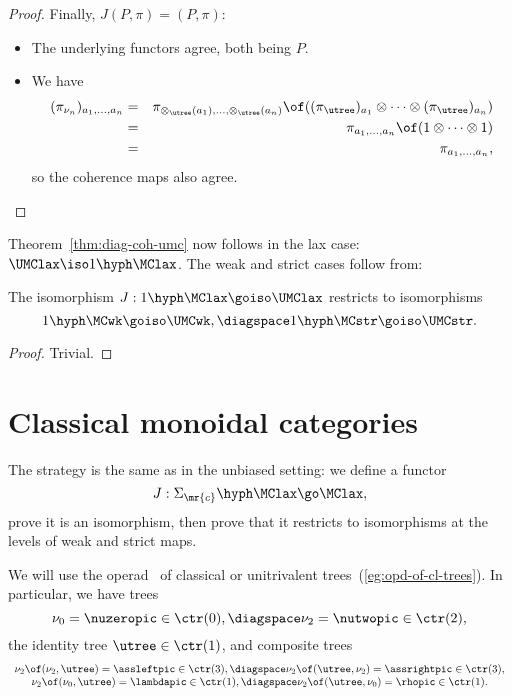 \begin{proof}
Finally, $J(P,\pi) = (P,\pi)$:
%
\begin{itemize}
\item The underlying functors agree, both being $P$.
\item We have
%
\begin{eqnarray*}
(\pi_{\nu_n})_{a_1, \ldots, a_n} &=	&
\pi_{\otimes_\utree(a_1), \ldots, \otimes_\utree(a_n)}
\of
((\pi_\utree)_{a_1} \otimes\cdots\otimes (\pi_\utree)_{a_n})	\\
	&=	&
\pi_{a_1, \ldots, a_n} \of (1 \otimes\cdots\otimes 1)	\\
	&=	&
\pi_{a_1, \ldots, a_n},
\end{eqnarray*}
so the coherence maps also agree.
\done
\end{itemize}
\end{proof}%
%
%

Theorem~\ref{thm:diag-coh-umc} now follows in the lax case: $\UMClax \iso
1\hyph\MClax$.  The weak and strict cases follow from:

\begin{lemma}	
The isomorphism $J: 1\hyph\MClax \goiso \UMClax$ restricts to 
isomorphisms
\[
1\hyph\MCwk \goiso \UMCwk,
\diagspace
1\hyph\MCstr \goiso \UMCstr.
\]
\end{lemma}

\begin{proof}
Trivial.
\done
\end{proof}%
%
%




\section{Classical monoidal categories}
%
%
%

The strategy is the same as in the unbiased setting: we define
a functor
\[
J: \Sigma_\mr{c}\hyph\MClax \go \MClax,
\]
prove it is an isomorphism, then prove that it restricts to isomorphisms at
the levels of weak and strict maps.

%
%
We will use the operad \ctr\ of classical or unitrivalent
trees~(\ref{eg:opd-of-cl-trees}).  In particular, we have trees
\[
\nu_0 = \nuzeropic \in \ctr(0), 
\diagspace
\nu_2 = \nutwopic \in \ctr(2), 
\]
the identity tree $\utree\in\ctr(1)$, and composite trees
\[
\begin{array}{c}
\nu_2 \of (\nu_2, \utree) = \assleftpic \in \ctr(3),
\diagspace
\nu_2 \of (\utree, \nu_2) = \assrightpic \in \ctr(3),\\
\nu_2 \of (\nu_0, \utree) = \lambdapic \in \ctr(1),
\diagspace
\nu_2 \of (\utree, \nu_0) = \rhopic \in \ctr(1).
\end{array}
\]


